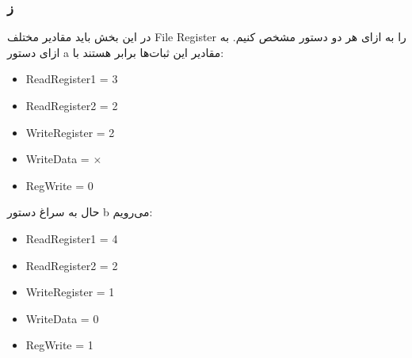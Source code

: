 \subsubsection*{ز}

در این بخش باید مقادیر مختلف File Register را به ازای هر دو دستور مشخص کنیم. به ازای دستور a مقادیر این ثبات‌ها برابر هستند با:

\setLTR

\begin{itemize}
	\item ReadRegister1 = 3
	\item ReadRegister2 = 2
	\item WriteRegister = 2
	\item WriteData = $\times$
	\item RegWrite = 0
\end{itemize}

\setRTL


حال به سراغ دستور b می‌رویم:

\setLTR

\begin{itemize}
	\item ReadRegister1 = 4
	\item ReadRegister2 = 2
	\item WriteRegister = 1
	\item WriteData = 0
	\item RegWrite = 1
\end{itemize}

\setRTL

